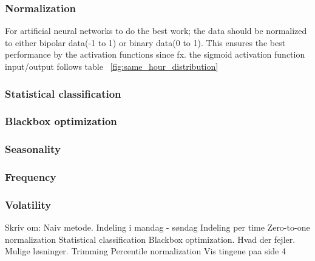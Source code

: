 \subsubsection{Normalization}
For artificial neural networks to do the best work; the data should be normalized to either bipolar data(-1 to 1) or binary data(0 to 1). This ensures the best performance by the activation functions since fx. the sigmoid activation function input/output follows table ~\ref{fig:same_hour_distribution}

\begin{table}[!ht]
\centering  %
\caption{Results from the simple classification approach} %
\label{table:naiveTrainingApproach} %
\end{table}

\subsubsection{Statistical classification}

\subsubsection{Blackbox optimization}

\subsubsection{Seasonality}

\subsubsection{Frequency}

\subsubsection{Volatility}

Skriv om:
	Naiv metode.
	Indeling i mandag - søndag
	Indeling per time
	Zero-to-one normalization
	Statistical classification
	Blackbox optimization.
	Hvad der fejler.
	Mulige løsninger.
	Trimming
	Percentile normalization
	Vis tingene paa side 4
